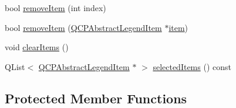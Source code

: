 \begin{DoxyCompactItemize}
bool \hyperlink{class_q_c_p_legend_ac91595c3eaa746fe6321d2eb952c63bb}{remove\+Item} (int index)
\item 
bool \hyperlink{class_q_c_p_legend_a2aea4ec6da2d454dd0b241a254d65082}{remove\+Item} (\hyperlink{class_q_c_p_abstract_legend_item}{Q\+C\+P\+Abstract\+Legend\+Item} $\ast$\hyperlink{class_q_c_p_legend_acfe9694c45104a3359d3806ed366fcf7}{item})
\item 
void \hyperlink{class_q_c_p_legend_a24795c7250eb5214fcea16b7217b4dfb}{clear\+Items} ()
\item 
Q\+List$<$ \hyperlink{class_q_c_p_abstract_legend_item}{Q\+C\+P\+Abstract\+Legend\+Item} $\ast$ $>$ \hyperlink{class_q_c_p_legend_ac7d9e567d5c551e09cd9bcc4306c5532}{selected\+Items} () const
\end{DoxyCompactItemize}
\subsection*{Protected Member Functions}
